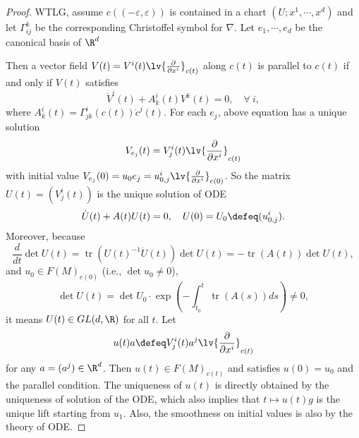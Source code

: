 \begin{proof}
    WTLG, assume $c((-\varepsilon,\varepsilon))$ is contained in a chart $(U;x^1,\cdots, x^d)$ and let $\Gamma^k_{ij}$ be the corresponding Christoffel symbol for $\nabla$. Let $e_1,\cdots,e_d$ be the canonical basis of $\R^d$

    Then a vector field $V(t) = V^i(t) \lv{\frac{\partial}{\partial x^i}}_{c(t)}$ along $c(t)$ is parallel to $c(t)$ if and only if $V(t)$ satisfies
    \begin{equation*}
        \dot{V}^i(t) + A^i_k(t)V^k(t) = 0,\quad \forall~i,
    \end{equation*}
    where $A^i_k(t) = \Gamma^i_{jk}(c(t))\dot{c}^j(t)$. For each $e_j$, above equation has a unique solution 
    \begin{equation*}
        V_{e_j}(t) = V^i_j(t)\lv{\frac{\partial}{\partial x^i}}_{c(t)}
    \end{equation*}
    with initial value $V_{e_j}(0) = u_0{e_j} = u_{0,j}^i \lv{\frac{\partial}{\partial x^i}}_{c(0)}$. So the matrix $U(t) = (V^i_j(t))$ is the unique solution of ODE
    \begin{equation*}
        \dot{U}(t) + A(t)U(t) = 0,\quad U(0) = U_0 \defeq (u^i_{0,j}).
    \end{equation*}
    Moreover, because
    \begin{equation*}
        \frac{d}{d t} \operatorname{det} U(t)=\operatorname{tr}\left(U(t)^{-1} \dot{U}(t)\right) \operatorname{det} U(t)=-\operatorname{tr}(A(t)) \operatorname{det} U(t),
    \end{equation*}
    and $u_0 \in F(M)_{c(0)}$ (i.e., $\det u_0 \neq 0$),
    \begin{equation*}
        \operatorname{det} U(t)=\operatorname{det} U_0 \cdot \exp \left(-\int_{t_0}^t \operatorname{tr}(A(s)) d s\right) \neq 0,
    \end{equation*}
    it means $U(t) \in GL(d,\R)$ for all $t$. Let
    \begin{equation*}
        u(t)a \defeq V^i_j(t)a^j \lv{\frac{\partial}{\partial x^i}}_{c(t)}
    \end{equation*}
    for any $a = (a^j) \in \R^d$. Then $u(t) \in F(M)_{c(t)}$ and satisfies $u(0) = u_0$ and the parallel condition. The uniqueness of $u(t)$ is directly obtained by the uniqueness of solution of the ODE, which also implies that $t \mapsto u(t)g$ is the unique lift starting from $u_1$. Also, the smoothness on initial values is also by the theory of ODE. \qedhere
\end{proof}
